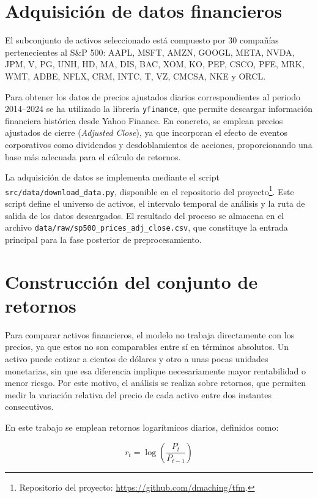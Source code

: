 \section{Adquisición de datos financieros}

El subconjunto de activos seleccionado está compuesto por 30 compañías pertenecientes al S\&P 500: AAPL, MSFT, AMZN, GOOGL, META, NVDA, JPM, V, PG, UNH, HD, MA, DIS, BAC, XOM, KO, PEP, CSCO, PFE, MRK, WMT, ADBE, NFLX, CRM, INTC, T, VZ, CMCSA, NKE y ORCL.

Para obtener los datos de precios ajustados diarios correspondientes al periodo 2014--2024 se ha utilizado la librería \texttt{yfinance}, que permite descargar información financiera histórica desde Yahoo Finance. En concreto, se emplean precios ajustados de cierre (\textit{Adjusted Close}), ya que incorporan el efecto de eventos corporativos como dividendos y desdoblamientos de acciones, proporcionando una base más adecuada para el cálculo de retornos.

La adquisición de datos se implementa mediante el script \texttt{src/data/download\_data.py}, disponible en el repositorio del proyecto\footnote{Repositorio del proyecto: \url{https://github.com/dmaching/tfm}.}. Este script define el universo de activos, el intervalo temporal de análisis y la ruta de salida de los datos descargados. El resultado del proceso se almacena en el archivo \texttt{data/raw/sp500\_prices\_adj\_close.csv}, que constituye la entrada principal para la fase posterior de preprocesamiento.

\section{Construcción del conjunto de retornos}

Para comparar activos financieros, el modelo no trabaja directamente con los precios, ya que estos no son comparables entre sí en términos absolutos. Un activo puede cotizar a cientos de dólares y otro a unas pocas unidades monetarias, sin que esa diferencia implique necesariamente mayor rentabilidad o menor riesgo. Por este motivo, el análisis se realiza sobre retornos, que permiten medir la variación relativa del precio de cada activo entre dos instantes consecutivos.

En este trabajo se emplean retornos logarítmicos diarios, definidos como:

\begin{equation}
r_t = \log\left(\frac{P_t}{P_{t-1}}\right)
\label{eq:retorno_logaritmico}
\end{equation}

